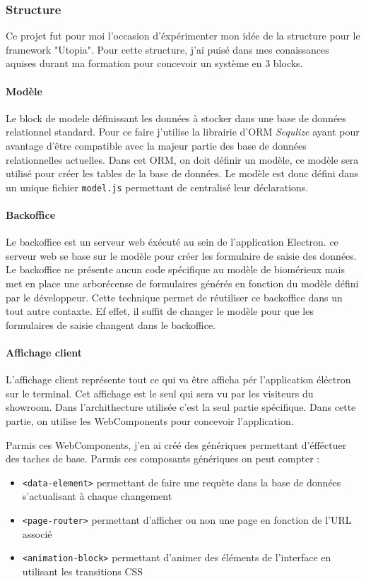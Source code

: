 \documentclass{article}
\begin{document}
\subsubsection{Structure}

Ce projet fut pour moi l'occasion d'éxpérimenter mon idée de la structure pour le framework "Utopia".
Pour cette structure, j'ai puisé dans mes conaissances aquises durant ma formation pour concevoir un système en 3 blocks.

\paragraph{Modèle} Le block de modele définissant les données à stocker dans une base de données relationnel standard.
Pour ce faire j'utilise la librairie d'ORM \emph{Sequlize} ayant pour avantage d'être compatible avec la majeur partie des base de données relationnelles actuelles.
Dans cet ORM, on doit définir un modèle, ce modèle sera utilisé pour créer les tables de la base de données.
Le modèle est donc défini dans un unique fichier \texttt{model.js} permettant de centralisé leur déclarations.

\paragraph{Backoffice} Le backoffice est un serveur web éxécuté au sein de l'application Electron.
ce serveur web se base sur le modèle pour créer les formulaire de saisie des données.
Le backoffice ne présente aucun code spécifique au modèle de biomérieux mais met en place une arborécense de formulaires générés en fonction du modèle défini par le développeur.
Cette technique permet de réutiliser ce backoffice dans un tout autre contaxte.
Ef effet, il suffit de changer le modèle pour que les formulaires de saisie changent dans le backoffice.

\paragraph{Affichage client} L'affichage client représente tout ce qui va être afficha pér l'application éléctron sur le terminal.
Cet affichage est le seul qui sera vu par les visiteurs du showroom.
Dans l'archithecture utilisée c'est la seul partie spécifique.
Dans cette partie, on utilise les WebComponents pour concevoir l'application.

Parmis ces WebComponents, j'en ai créé des génériques permettant d'éfféctuer des taches de base.
Parmis ces composants génériques on peut compter :
\begin{itemize}
    \item \texttt{<data-element>} permettant de faire une requète dans la base de données s'actualisant à chaque changement
    \item \texttt{<page-router>} permettant d'afficher ou non une page en fonction de l'URL associé
    \item \texttt{<animation-block>} permettant d'animer des éléments de l'interface en utilisant les transitions CSS
\end{itemize}
\end{document}
